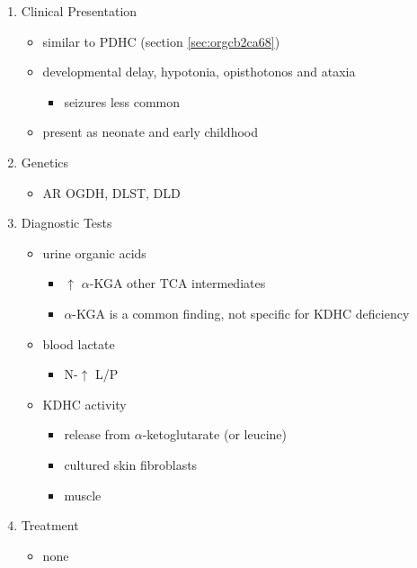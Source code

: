 \documentclass{scrartcl}
\begin{document}
\begin{enumerate}
\item Clinical Presentation
\label{sec:org89ccef5}
\begin{itemize}
\item similar to PDHC (section \ref{sec:orgcb2ca68})
\item developmental delay, hypotonia, opisthotonos and ataxia
\begin{itemize}
\item seizures less common
\end{itemize}
\item present as neonate and early childhood
\end{itemize}

\item Genetics
\label{sec:org58d9f1f}
\begin{itemize}
\item AR OGDH, DLST, DLD
\end{itemize}

\item Diagnostic Tests
\label{sec:org8a6de2c}
\begin{itemize}
\item urine organic acids
\begin{itemize}
\item \(\uparrow\) \(\alpha\)-KGA \textpm{} other TCA intermediates
\item \(\alpha\)-KGA is a common finding, not specific for KDHC deficiency
\end{itemize}
\item blood lactate
\begin{itemize}
\item N-\(\uparrow\) L/P
\end{itemize}
\item KDHC activity
\begin{itemize}
\item {} release from \ce{[1-^14C]} \(\alpha\)-ketoglutarate (or \ce{[1-^14C]} leucine)
\item cultured skin fibroblasts
\item muscle
\end{itemize}
\end{itemize}

\item Treatment
\label{sec:org9a0a0db}
\begin{itemize}
\item none
\end{itemize}
\end{enumerate}
\end{document}
